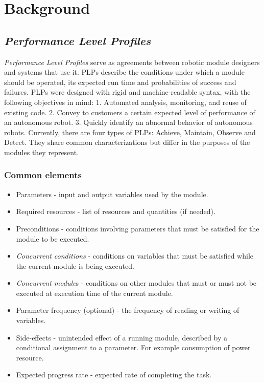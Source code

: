 \chapter{Background}
\section{\textit{Performance Level Profiles}}
\textit{Performance Level Profiles} serve as agreements between robotic module designers and systems that use it. PLPs describe the conditions under which a module should be operated, its expected run time and probabilities of success and failures. PLPs were designed with rigid and machine-readable syntax, with the following objectives in mind: 1. Automated analysis, monitoring, and reuse of existing code. 2. Convey to customers a certain expected level of performance of an autonomous robot. 3. Quickly identify an abnormal behavior of autonomous robots. Currently, there are four types of PLPs: Achieve, Maintain, Observe and Detect. They share common characterizations but differ in the purposes of the modules they represent.\\
\subsection{Common elements \label{plp_common_elements}}
\begin{itemize}
\item Parameters - input and output variables used by the module.
\item Required resources - list of resources and quantities (if needed).
\item Preconditions - conditions involving parameters that must be satisfied for the module to be executed.
\item \textit{Concurrent conditions} - conditions on variables that must be satisfied while the current module is being executed.
\item \textit{Concurrent module}s - conditions on other modules that must or must not be executed at execution time of the current module.
\item Parameter frequency (optional) - the frequency of reading or writing of variables.
\item Side-effects - unintended effect of a running module, described by a conditional assignment to a parameter. For example consumption of power resource.
\item Expected progress rate - expected rate of completing the task.
\end{itemize}
